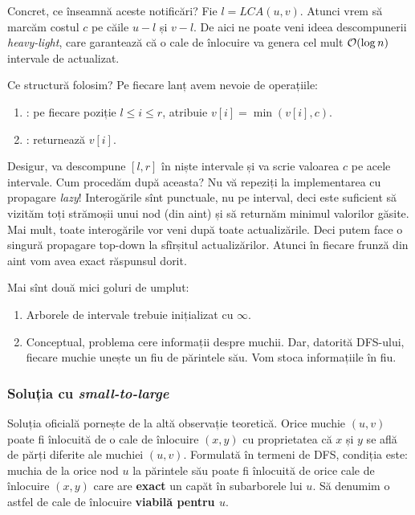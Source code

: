 \documentclass[../main.tex]{subfiles}
\begin{document}
Concret, ce înseamnă aceste notificări? Fie $l = LCA(u,v)$. Atunci vrem să marcăm costul $c$ pe căile $u-l$ și $v-l$. De aici ne poate veni ideea descompunerii \textit{heavy-light}, care garantează că o cale de înlocuire va genera cel mult $\mathcal{O}(\log n)$ intervale de actualizat.

Ce structură folosim? Pe fiecare lanț avem nevoie de operațiile:

\begin{enumerate}
  \item {}: pe fiecare poziție $l \leq i \leq r$, atribuie $v[i] = \min(v[i], c)$.
  \item {}: returnează $v[i]$.
\end{enumerate}

Desigur,  va descompune $[l,r]$ în niște intervale și va scrie valoarea $c$ pe acele intervale. Cum procedăm după aceasta? Nu vă repeziți la implementarea cu propagare \textit{lazy}! Interogările sînt punctuale, nu pe interval, deci este suficient să vizităm toți strămoșii unui nod (din aint) și să returnăm minimul valorilor găsite. Mai mult, toate interogările vor veni după toate actualizările. Deci putem face o singură propagare top-down la sfîrșitul actualizărilor. Atunci în fiecare frunză din aint vom avea exact răspunsul dorit.

Mai sînt două mici goluri de umplut:

\begin{enumerate}
  \item Arborele de intervale trebuie inițializat cu $\infty$.

  \item Conceptual, problema cere informații despre muchii. Dar, datorită DFS-ului, fiecare muchie unește un fiu de părintele său. Vom stoca informațiile în fiu.
\end{enumerate}

\subsubsection*{Soluția cu \textit{small-to-large}}

Soluția oficială pornește de la altă observație teoretică. Orice muchie $(u,v)$ poate fi înlocuită de o cale de înlocuire $(x,y)$ cu proprietatea că $x$ și $y$ se află de părți diferite ale muchiei $(u,v)$. Formulată în termeni de DFS, condiția este: muchia de la orice nod $u$ la părintele său poate fi înlocuită de orice cale de înlocuire $(x,y)$ care are \textbf{exact} un capăt în subarborele lui $u$. Să denumim o astfel de cale de înlocuire \textbf{viabilă pentru $u$}.
\end{document}
